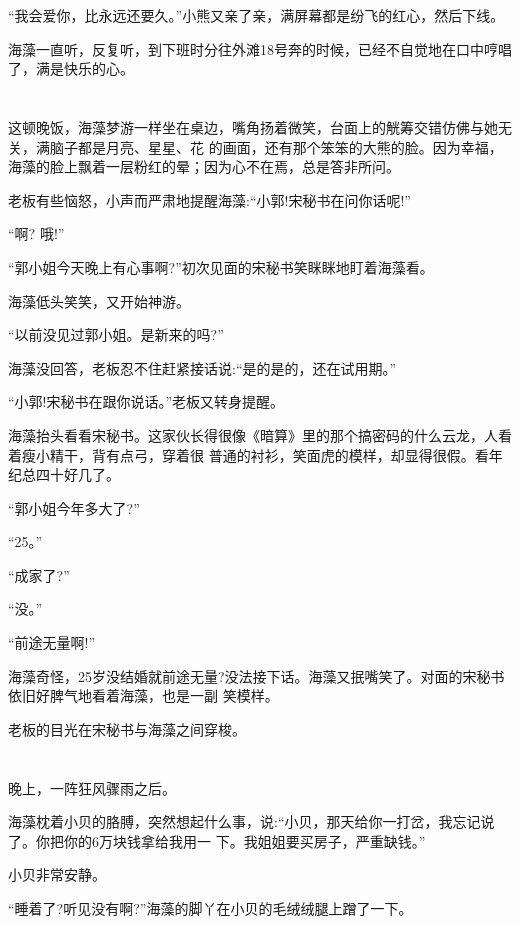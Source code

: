 \documentclass[11pt,a4paper,onecolumn]{article}
\begin{document}
``我会爱你，比永远还要久。''小熊又亲了亲，满屏幕都是纷飞的红心，然后下线。

海藻一直听，反复听，到下班时分往外滩18号奔的时候，已经不自觉地在口中哼唱了，满是快乐的心。

\section[\thesection]{}

这顿晚饭，海藻梦游一样坐在桌边，嘴角扬着微笑，台面上的觥筹交错仿佛与她无关，满脑子都是月亮、星星、花
的画面，还有那个笨笨的大熊的脸。因为幸福，海藻的脸上飘着一层粉红的晕；因为心不在焉，总是答非所问。

老板有些恼怒，小声而严肃地提醒海藻:``小郭!宋秘书在问你话呢!''

``啊? 哦!''

``郭小姐今天晚上有心事啊?''初次见面的宋秘书笑眯眯地盯着海藻看。

海藻低头笑笑，又开始神游。

``以前没见过郭小姐。是新来的吗?''

海藻没回答，老板忍不住赶紧接话说:``是的是的，还在试用期。''

``小郭!宋秘书在跟你说话。''老板又转身提醒。

海藻抬头看看宋秘书。这家伙长得很像《暗算》里的那个搞密码的什么云龙，人看着瘦小精干，背有点弓，穿着很
普通的衬衫，笑面虎的模样，却显得很假。看年纪总四十好几了。

``郭小姐今年多大了?''

``25。''

``成家了?''

``没。''

``前途无量啊!''

海藻奇怪，25岁没结婚就前途无量?没法接下话。海藻又抿嘴笑了。对面的宋秘书依旧好脾气地看着海藻，也是一副
笑模样。

老板的目光在宋秘书与海藻之间穿梭。

\section[\thesection]{}

晚上，一阵狂风骤雨之后。

海藻枕着小贝的胳膊，突然想起什么事，说:``小贝，那天给你一打岔，我忘记说了。你把你的6万块钱拿给我用一
下。我姐姐要买房子，严重缺钱。''

小贝非常安静。

``睡着了?听见没有啊?''海藻的脚丫在小贝的毛绒绒腿上蹭了一下。
\end{document}
